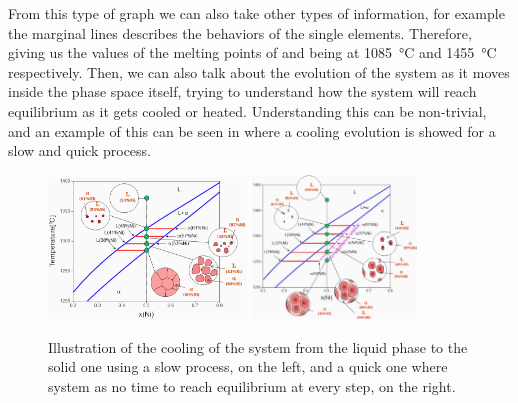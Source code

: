 From this type of graph we can also take other types of information, for example the marginal lines describes the behaviors of the single elements. Therefore, giving us the values of the melting points of  and  being at \SI{1085}{\celsius} and \SI{1455}{\celsius} respectively. Then, we can also talk about the evolution of the system as it moves inside the phase space itself, trying to understand how the system will reach equilibrium as it gets cooled or heated. Understanding this can be non-trivial, and an example of this can be seen in  where a cooling evolution is showed for a slow and quick process.
\begin{figure}[t]
    \centering
    \includegraphics[width=0.47\textwidth]{Immagini/Cu-NiEvo.png}
    \includegraphics[width=0.39\textwidth]{Immagini/Cu-NiEvoQuick.png}
    \caption
    {
        Illustration of the cooling of the system from the liquid phase to the solid one using a slow process, on the left, and a quick one where system as no time to reach equilibrium at every step, on the right.
    }
    \label{fig:Cu-NiEvo}
\end{figure}

